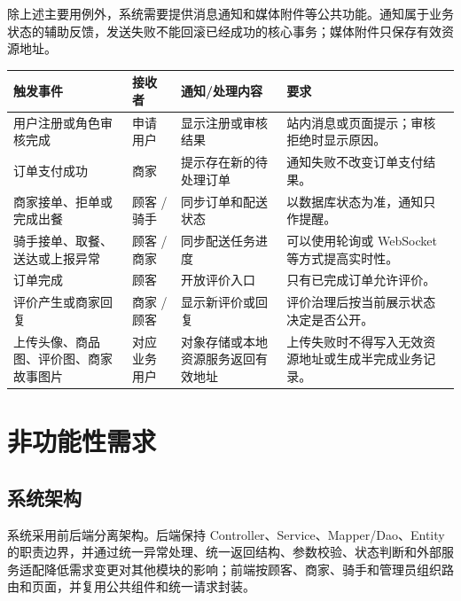 除上述主要用例外，系统需要提供消息通知和媒体附件等公共功能。通知属于业务状态的辅助反馈，发送失败不能回滚已经成功的核心事务；媒体附件只保存有效资源地址。

\begin{longtable}{|>{\raggedright\arraybackslash}p{}|>{\raggedright\arraybackslash}p{}|>{\raggedright\arraybackslash}p{}|>{\raggedright\arraybackslash}p{}|}
\hline
\textbf{触发事件} & \textbf{接收者} & \textbf{通知/处理内容} & \textbf{要求} \\ \hline
用户注册或角色审核完成 & 申请用户 & 显示注册或审核结果 & 站内消息或页面提示；审核拒绝时显示原因。 \\ \hline
订单支付成功 & 商家 & 提示存在新的待处理订单 & 通知失败不改变订单支付结果。 \\ \hline
商家接单、拒单或完成出餐 & 顾客 / 骑手 & 同步订单和配送状态 & 以数据库状态为准，通知只作提醒。 \\ \hline
骑手接单、取餐、送达或上报异常 & 顾客 / 商家 & 同步配送任务进度 & 可以使用轮询或 WebSocket 等方式提高实时性。 \\ \hline
订单完成 & 顾客 & 开放评价入口 & 只有已完成订单允许评价。 \\ \hline
评价产生或商家回复 & 商家 / 顾客 & 显示新评价或回复 & 评价治理后按当前展示状态决定是否公开。 \\ \hline
上传头像、商品图、评价图、商家故事图片 & 对应业务用户 & 对象存储或本地资源服务返回有效地址 & 上传失败时不得写入无效资源地址或生成半完成业务记录。 \\ \hline
\end{longtable}

\section{非功能性需求}

\subsection{系统架构}

系统采用前后端分离架构。后端保持 Controller、Service、Mapper/Dao、Entity 的职责边界，并通过统一异常处理、统一返回结构、参数校验、状态判断和外部服务适配降低需求变更对其他模块的影响；前端按顾客、商家、骑手和管理员组织路由和页面，并复用公共组件和统一请求封装。

